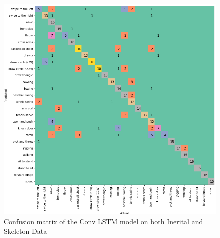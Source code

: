 \documentclass[conference]{IEEEtran}
\begin{document}
\begin{figure}[H]
\begin{center}
\includegraphics[scale=0.3]{conv_LSTM_iner_skel/conv_lstm_confusion_matrix_iner_skel.png}
\end{center}
\caption{\label{fig:confusion_matrix_conv_LSTM_iner_skel} 
Confusion matrix of the Conv LSTM model on both Inerital and Skeleton Data}
\end{figure}
\end{document}
